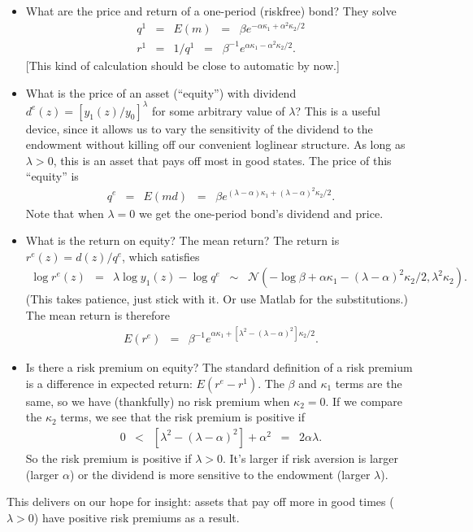 \documentclass[11pt]{article}
\begin{document}
\begin{itemize}
\item What are the price and return of a one-period (riskfree) bond?
They solve
\begin{eqnarray*}
    q^1 &=& E(m) \;\;=\;\; \beta e^{ - \alpha \kappa_1 + \alpha^2 \kappa_2/2 } \\
    r^1 &=& 1/q^1 \;\;=\;\; \beta^{-1} e^{\alpha \kappa_1 - \alpha^2 \kappa_2/2 } .
\end{eqnarray*}
[This kind of calculation should be close to automatic by now.]
\item What is the price of an asset (``equity'') with dividend
$d^e(z) = [y_1(z)/y_0]^\lambda$ for some
arbitrary value of $\lambda$?
This is a useful device, since it allows us to vary the sensitivity of the dividend
to the endowment without killing off our convenient loglinear structure.
As long as $\lambda > 0$, this is an asset that pays off most in good states.
The price of this ``equity'' is
\begin{eqnarray*}
    q^e &=& E(md) \;\;=\;\; \beta e^{ (\lambda- \alpha) \kappa_1
    + (\lambda-\alpha)^2 \kappa_2/2 } .
\end{eqnarray*}
Note that when $\lambda = 0$ we get the one-period bond's dividend and price.
\item What is the return on equity?  The mean return?
The return is $r^e(z) = d(z)/q^e$, which satisfies
\begin{eqnarray*}
    \log r^e(z) &=& \lambda \log y_1(z) - \log q^e
            \;\;\sim \;\; \mathcal{N}
            (-\log \beta + \alpha \kappa_1 - (\lambda-\alpha)^2 \kappa_2/2, \lambda^2 \kappa_2) .
\end{eqnarray*}
(This takes patience, just stick with it.  Or use Matlab for the substitutions.)
The mean return is therefore
\begin{eqnarray*}
    E (r^e) &=& \beta^{-1} e^{\alpha \kappa_1 + [\lambda^2 - (\lambda-\alpha)^2] \kappa_2/2 } .
\end{eqnarray*}

\item Is there a risk premium on equity?
The standard definition of a risk premium is a difference in expected return:  $E(r^e-r^1)$.
The $\beta$ and $\kappa_1$ terms are the same, so we have (thankfully)
no risk premium when $\kappa_2 = 0$.
If we compare the $\kappa_2$ terms, we see that the risk premium is positive if
\begin{eqnarray*}
    0 &<& [\lambda^2 - (\lambda-\alpha)^2] + \alpha^2 \;\;=\;\; 2 \alpha \lambda .
\end{eqnarray*}
So the risk premium is positive if $\lambda > 0$.
It's larger if risk aversion is larger (larger $\alpha$)
or the dividend is more sensitive to the endowment (larger $\lambda$).
\end{itemize}
This delivers on our hope for insight:
assets that pay off more in good times ($\lambda>0$) have positive risk premiums as a result.
\end{document}
